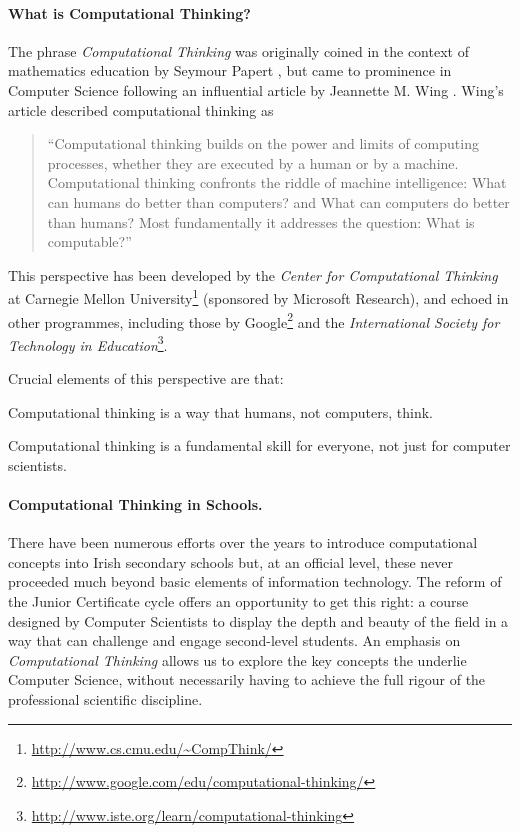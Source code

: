 \documentclass[a4paper]{article}
\begin{document}
\paragraph{What is Computational Thinking?}

The phrase \textit{Computational Thinking} was originally coined in the context of mathematics education by Seymour Papert \cite{papert96}, but came to prominence in Computer Science following an influential article by Jeannette M. Wing \cite{wing-cacm06}.  Wing's article described computational thinking as
\begin{quotation}
``Computational thinking builds on the power and limits of computing processes, whether they are executed by a human or by a machine.  Computational thinking confronts the riddle of machine intelligence: What can humans do better than computers? and What can computers do better than humans? Most fundamentally it addresses the question: What is computable?''
\end{quotation}


This perspective has been developed by the 
\textit{Center for Computational Thinking} at Carnegie Mellon University\footnote{\url{http://www.cs.cmu.edu/~CompThink/}}
(sponsored by Microsoft Research), and echoed in other programmes, including those by 
Google\footnote{\url{http://www.google.com/edu/computational-thinking/}} and the
\textit{International Society for Technology in Education}\footnote{\url{http://www.iste.org/learn/computational-thinking}}.

Crucial elements of this perspective are that:
\begin{compactitem}
\item Computational thinking is a way that humans, not computers, think.
\item Computational thinking is a fundamental skill for
everyone, not just for computer scientists.
\end{compactitem}


\paragraph{Computational Thinking in Schools.} \label{par:CTSchools}

There have been numerous efforts over the years to introduce computational concepts into Irish secondary schools but, at an official level, these never proceeded much beyond basic elements of information technology.  The reform of the Junior Certificate cycle offers an opportunity to get this right: a course designed by Computer Scientists to display the depth and beauty of the field in a way that can challenge and engage second-level students.  An emphasis on 
\textit{Computational Thinking} allows us to explore the key concepts the underlie Computer Science, without necessarily having to achieve the full rigour of the professional scientific discipline.
\end{document}
